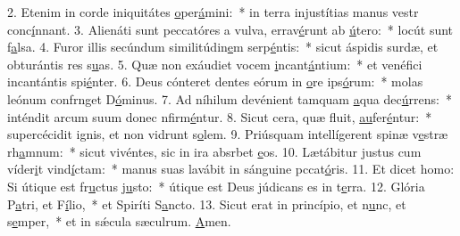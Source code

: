 2. Etenim in corde iniquitátes \uline{o}per\uline{á}mini:~* in terra injustítias manus vestr conc\uline{í}nnant.
3. Alienáti sunt peccatóres a vulva, errav\uline{é}runt ab \uline{ú}tero:~* locút sunt f\uline{a}lsa.
4. Furor illis secúndum similitúdin\uline{e}m serp\uline{é}ntis:~* sicut áspidis surdæ, et obturántis res s\uline{u}as.
5. Quæ non exáudiet vocem \uline{i}ncant\uline{á}ntium:~* et venéfici incantántis spi\uline{é}nter.
6. Deus cónteret dentes eórum in \uline{o}re ips\uline{ó}rum:~* molas leónum confrnget D\uline{ó}minus.
7. Ad níhilum devénient tamquam \uline{a}qua dec\uline{ú}rrens:~* inténdit arcum suum donec nfirm\uline{é}ntur.
8. Sicut cera, quæ fluit, \uline{au}fer\uline{é}ntur:~* supercécidit ignis, et non vidrunt s\uline{o}lem.
9. Priúsquam intellígerent spinæ v\uline{e}stræ rh\uline{a}mnum:~* sicut vivéntes, sic in ira absrbet \uline{e}os.
10. Lætábitur justus cum víder\uline{i}t vind\uline{í}ctam:~* manus suas lavábit in sánguine pccat\uline{ó}ris.
11. Et dicet homo: Si útique est fr\uline{u}ctus j\uline{u}sto:~* útique est Deus júdicans es in t\uline{e}rra.
12. Glória P\uline{a}tri, et F\uline{í}lio,~* et Spiríti S\uline{a}ncto.
13. Sicut erat in princípio, et n\uline{u}nc, et s\uline{e}mper,~* et in sǽcula sæculrum. \uline{A}men.
